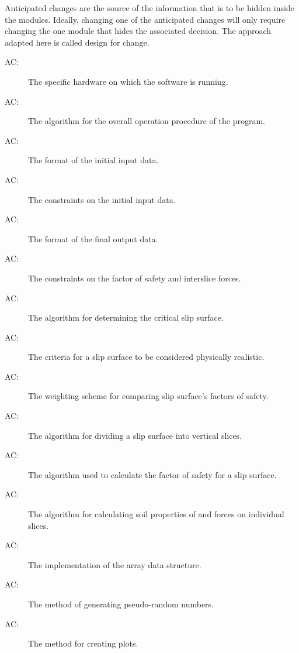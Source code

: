 \documentclass[12pt, titlepage]{article}
\newcounter{acnum}
\begin{document}
\hspace{3ex}Anticipated changes are the source of the information that
is to be hidden inside the modules. Ideally, changing one of the
anticipated changes will only require changing the one module that
hides the associated decision. The approach adapted here is called
design for change.

\begin{description}
\item[AC\theacnum \label{AC_hardware}:] The
  specific hardware on which the software is running.
\item[AC\theacnum \label{AC_Control}:] The
  algorithm for the overall operation procedure of the program.
\item[AC\theacnum \label{AC_input}:] The format
  of the initial input data.
\item[AC\theacnum \label{AC_inputConstraints}:] The       
constraints on the initial input data.
\item[AC\theacnum \label{AC_output}:] The format
  of the final output data.
\item[AC\theacnum \label{AC_outputConstraints}:] The     
constraints on the factor of safety and interslice forces.
\item[AC\theacnum \label{AC_GenAlg}:] The algorithm
  for determining the critical slip surface.
\item[AC\theacnum \label{AC_Kin}:] The criteria for
  a slip surface to be considered physically realistic.
\item[AC\theacnum \label{AC_FSweight}:] The
  weighting scheme for comparing slip surface's factors of safety.
\item[AC\theacnum \label{AC_Slicer}:] The
  algorithm for dividing a slip surface into vertical slices.
\item[AC\theacnum \label{AC_CalcFS}:] The algorithm used 
to calculate the factor of safety for a slip surface.
\item[AC\theacnum \label{AC_PropSorter}:] The
  algorithm for calculating soil properties of and forces on individual slices.
\item[AC\theacnum \label{AC_Array}:] The
  implementation of the array data structure.
\item[AC\theacnum \label{AC_Rand}:] The method
  of generating pseudo-random numbers.
\item[AC\theacnum \label{AC_Plot}:] The method
  for creating plots.
\end{description}
\end{document}

